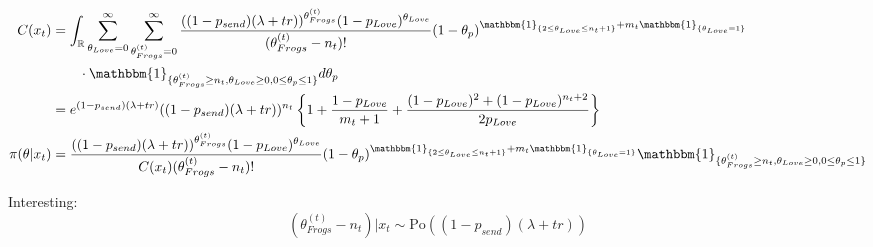 \documentclass[10pt, a4paper]{article}
\begin{document}
    \begin{align*}
        C(x_t) 
        &= \int_{\mathbb{R}}\sum_{\theta_{Love}=0}^{\infty}\sum_{\theta_{Frogs}^{(t)}=0}^{\infty}\frac{((1-p_{send})(\lambda+tr))^{\theta_{Frogs}^{(t)}}(1-p_{Love})^{\theta_{Love}}}{(\theta_{Frogs}^{(t)}-n_t)!}(1-\theta_p)^{\mathbbm{1}_{\{2\leq\theta_{Love}\leq n_t+1\}} + m_t\mathbbm{1}_{\{\theta_{Love} = 1\}}}\\&\qquad\cdot\mathbbm{1}_{\{\theta_{Frogs}^{(t)}\geq n_t, \theta_{Love}\geq 0, 0 \leq \theta_p \leq 1\}}d\theta_p \\
        &= e^{(1-p_{send})(\lambda+tr)}((1-p_{send})(\lambda+tr))^{n_t} \left\{1 + \frac{1-p_{Love}}{m_t+1} + \frac{(1-p_{Love})^2 + (1-p_{Love})^{n_t+2}}{2p_{Love}}\right\} \\
        \pi(\theta|x_t)
        &= \frac{((1-p_{send})(\lambda+tr))^{\theta_{Frogs}^{(t)}}(1-p_{Love})^{\theta_{Love}}}{C(x_t)(\theta_{Frogs}^{(t)}-n_t)!}(1-\theta_p)^{\mathbbm{1}_{\{2\leq\theta_{Love}\leq n_t+1\}} + m_t\mathbbm{1}_{\{\theta_{Love} = 1\}}}\mathbbm{1}_{\{\theta_{Frogs}^{(t)}\geq n_t, \theta_{Love}\geq 0, 0 \leq \theta_p \leq 1\}}
    \end{align*}

    Interesting: $$(\theta_{Frogs}^{(t)} - n_t)|x_t \sim \mathrm{Po}((1-p_{send})(\lambda+tr))$$
\end{document}
